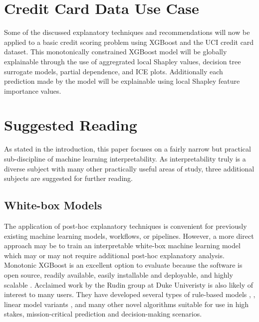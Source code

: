 \documentclass[11pt]{asaproc}
\begin{document}
\section{Credit Card Data Use Case} \label{sec:use_case}

Some of the discussed explanatory techniques and recommendations will now be applied to a basic credit scoring problem using XGBoost and the UCI credit card dataset. This monotonically constrained XGBoost model will be globally explainable through the use of aggregrated local Shapley values, decision tree surrogate models, partial dependence, and ICE plots. Additionally each prediction made by the model will be explainable using local Shapley feature importance values. 


\section{Suggested Reading} \label{sec:suggested}

As stated in the introduction, this paper focuses on a fairly narrow but practical sub-discipline of machine learning interpretability. As interpretability truly is a diverse subject with many other practically useful areas of study, three additional subjects are suggested for further reading.

\subsection{White-box Models}

The application of post-hoc explanatory techniques is convenient for previously existing machine learning models, workflows, or pipelines. However, a more direct approach may be to train an interpretable white-box machine learning model which may or may not require additional post-hoc explanatory analysis. Monotonic XGBoost is an excellent option to evaluate because the software is open source, readily available, easily installable and deployable, and highly scalable \cite{xgboost}. Acclaimed work by the Rudin group at Duke Univeristy is also likely of interest to many users. They have developed several types of rule-based models \cite{corels}, \cite{sbrl}, linear model variants \cite{slim}, and many other novel algorithms suitable for use in high stakes, mission-critical prediction and decision-making scenarios. 
\end{document}
